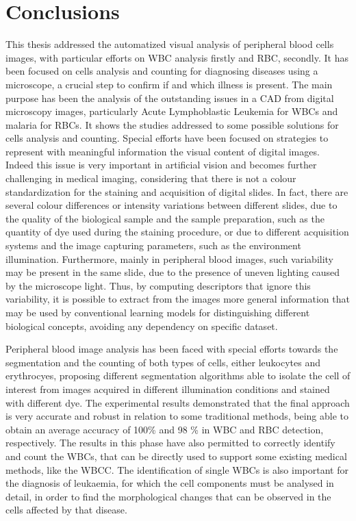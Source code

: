 \documentclass[final,a4paper,12pt,english]{UnicaPhdThesis3}
\begin{document}
\chapter*{Conclusions} \label{tre}
This thesis addressed the automatized visual analysis of peripheral blood cells images, with particular efforts on WBC analysis firstly and RBC, secondly. It has been focused on cells analysis and counting for diagnosing diseases using a microscope, a crucial step to confirm if and which illness is present. The main purpose has been the analysis of the outstanding issues in a CAD from digital microscopy images, particularly Acute Lymphoblastic Leukemia for WBCs and malaria for RBCs. It shows the studies addressed to some possible solutions for cells analysis and counting. Special efforts have been focused on strategies to represent with meaningful information the visual content of digital images. Indeed this issue is very important in artificial vision and becomes further challenging in medical imaging, considering that there is not a colour standardization for the staining and acquisition of digital slides. In fact, there are several colour differences or intensity variations between different slides, due to the quality of the biological sample and the sample preparation, such as the quantity of dye used during the staining procedure, or due to different acquisition systems and the image capturing parameters, such as the environment illumination. Furthermore, mainly in peripheral blood images, such variability may be present in the same slide, due to the presence of uneven lighting caused by the microscope light. Thus, by computing descriptors that ignore this variability, it is possible to extract from the images more general information that may be used by conventional learning models for distinguishing different biological concepts, avoiding any dependency on specific dataset. 

Peripheral blood image analysis has been faced with special efforts towards the segmentation and the counting of both types of cells, either leukocytes and erythrocyes, proposing different segmentation algorithms able to isolate the cell of interest from images acquired in different illumination conditions and stained with different dye. 
The experimental results demonstrated that the final approach is very accurate and robust in relation to some traditional methods, being able to obtain an average accuracy of 100\% and 98 \% in WBC and RBC detection, respectively. The results in this phase have also permitted to correctly identify and count the WBCs, that can be directly used to support some existing medical methods, like the WBCC. 
The identification of single WBCs is also important for the diagnosis of leukaemia, for which the cell components must be analysed in detail, in order to find the morphological changes that can be observed in the cells affected by that disease.
\end{document}
